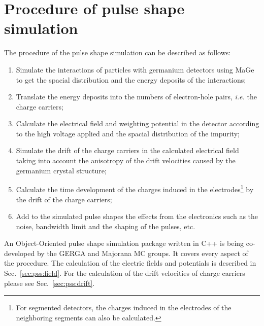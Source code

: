 \section{Procedure of pulse shape simulation}
\label{sec:pss:proc}
The procedure of the pulse shape simulation\cite{agata} can be described as follows:
\begin{enumerate}
\item Simulate the interactions of particles with germanium detectors using MaGe\cite{Mag08} to get the spacial distribution and the energy deposits of the interactions;
\item Translate the energy deposits into the numbers of electron-hole pairs, \textit{i.e.} the charge carriers;
\item Calculate the electrical field and weighting potential\cite{Gat82, Rad88, He00} in the detector according to the high voltage applied and the spacial distribution of the impurity;
\item Simulate the drift of the charge carriers in the calculated electrical field taking into account the anisotropy of the drift velocities caused by the germanium crystal structure;
\item Calculate the time development of the charges induced in the electrodes\footnote{For segmented detectors, the charges induced in the electrodes of the neighboring segments can also be calculated.} by the drift of the charge carriers\cite{igex}; 
\item Add to the simulated pulse shapes the effects from the electronics such as the noise, bandwidth limit and the shaping of the pulses, etc.
\end{enumerate}
An Object-Oriented pulse shape simulation package written in C++ is being co-developed by the GERGA and Majorana MC groups. It covers every aspect of the procedure. The calculation of the electric fields and potentials is described in Sec.~\ref{sec:pss:field}. For the calculation of the drift velocities of charge carriers please see Sec.~\ref{sec:pss:drift}.

